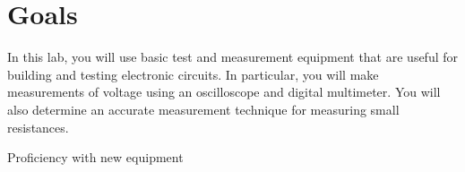 \documentclass[10pt]{PhysLab1C} %
\begin{document}
\maketitle %


\thispagestyle{firstpage} %


\section{Goals} %

In this lab, you will use basic test and measurement equipment that are
useful for building and testing electronic circuits. In particular, you will
make measurements of voltage using an oscilloscope and digital
multimeter. You will also determine an accurate measurement technique
for measuring small resistances.

Proficiency with new equipment
\end{document}
